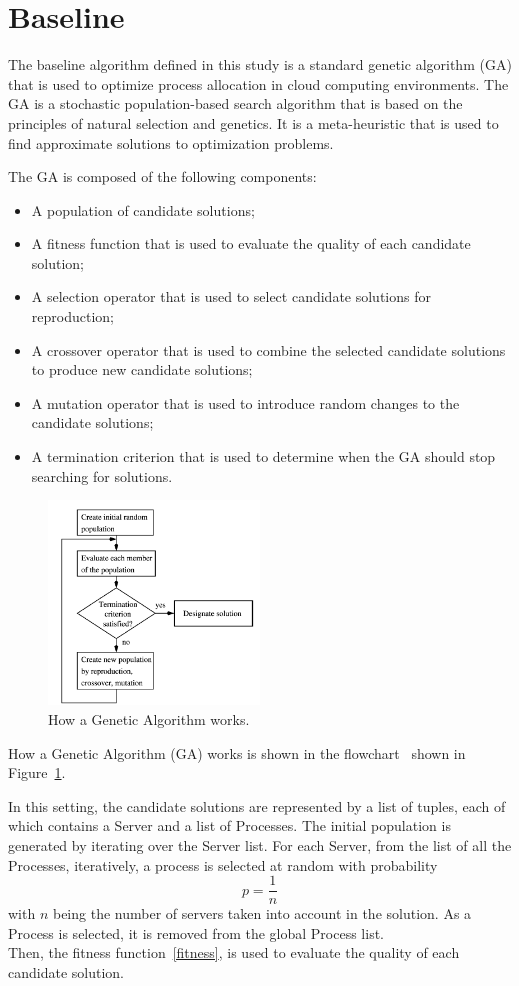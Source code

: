\section{Baseline}\label{sect:baseline}

The baseline algorithm defined in this study is a standard genetic algorithm (GA) that is used to optimize 
process allocation in cloud computing environments.
The GA is a stochastic population-based search algorithm that is based on the principles of natural selection and genetics.
It is a meta-heuristic that is used to find approximate solutions to optimization problems.

The GA is composed of the following components:
\begin{itemize}
    \item A population of candidate solutions;
    \item A fitness function that is used to evaluate the quality of each candidate solution;
    \item A selection operator that is used to select candidate solutions for reproduction;
    \item A crossover operator that is used to combine the selected candidate solutions to produce new candidate solutions;
    \item A mutation operator that is used to introduce random changes to the candidate solutions;
    \item A termination criterion that is used to determine when the GA should stop searching for solutions.
\end{itemize}

\begin{figure}[h]
    \centering
    \includegraphics[width=0.5\textwidth]{./resources/examples/GAWorkflow.png}
    \caption{How a Genetic Algorithm works.}
    \label{fig:baseline}
\end{figure}
How a Genetic Algorithm (GA) works is shown in the flowchart~\cite{GAWorkflow} shown in Figure~\ref{fig:baseline}.

In this setting, the candidate solutions are represented by a list of tuples, each of which contains a Server and a list of Processes.
The initial population is generated by iterating over the Server list. 
For each Server, from the list of all the Processes, iteratively, a process is selected at random with probability $$p = \frac{1}{n}$$
with $n$ being the number of servers taken into account in the solution. As a Process is selected, it is removed from the global Process list.\\

Then, the fitness function~\eqref{fitness}, is used to evaluate the quality of each candidate solution.
